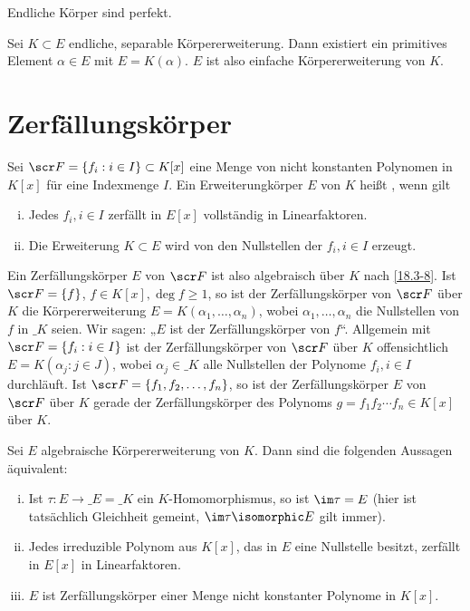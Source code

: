 \begin{kor} \label{19.2-5}
	Endliche Körper sind perfekt.
\end{kor}

\begin{st}
	Sei $K \subset E$ endliche, separable Körpererweiterung.
	Dann existiert ein primitives Element $\alpha \in E$ mit $E = K(\alpha)$.
	$E$ ist also einfache Körpererweiterung von $K$.
\end{st}


\section{Zerfällungskörper}


\begin{df} \label{19.3-1}
	Sei $\scr F = \{ f_i : i \in I \} \subset K[x]$ eine Menge von nicht konstanten Polynomen in $K[x]$ für eine Indexmenge $I$.
	Ein Erweiterungkörper $E$ von $K$ heißt , wenn gilt
	\begin{enumerate}[i)]
		\item
			Jedes $f_i, i \in I$ zerfällt in $E[x]$ vollständig in Linearfaktoren.
		\item
			Die Erweiterung $K \subset E$ wird von den Nullstellen der $f_i, i \in I$ erzeugt.
	\end{enumerate}
\end{df}

Ein Zerfällungskörper $E$ von $\scr F$ ist also algebraisch über $K$ nach \ref{18.3-8}.
Ist $\scr F = \{f\}$, $f \in K[x], \deg f \ge 1$, so ist der Zerfällungskörper von $\scr F$ über $K$ die Körpererweiterung $E = K(\alpha_1, \dotsc, \alpha_n)$, wobei $\alpha_1, \dotsc, \alpha_n$ die Nullstellen von $f$ in $\_K$ seien.
Wir sagen: „$E$ ist der Zerfällungskörper von $f$“.
Allgemein mit $\scr F = \{ f_i : i \in I\}$ ist der Zerfällungskörper von $\scr F$ über $K$ offensichtlich $E = K(\alpha_j : j \in J)$, wobei $\alpha_j \in \_K$ alle Nullstellen der Polynome $f_i, i \in I$ durchläuft.
Ist $\scr F = \{ f_1, f_2, \dotsc, f_n \}$, so ist der Zerfällungskörper $E$ von $\scr F$ über $K$ gerade der Zerfällungskörper des Polynoms $g = f_1 f_2 \dotsb f_n \in K[x]$ über $K$.

\begin{st} \label{19.3-2}
	Sei $E$ algebraische Körpererweiterung von $K$.
	Dann sind die folgenden Aussagen äquivalent:
	\begin{enumerate}[i)]
		\item
			Ist $\tau: E \to \_E = \_K$ ein $K$-Homomorphismus, so ist $\im \tau = E$ (hier ist tatsächlich Gleichheit gemeint, $\im \tau \isomorphic E$ gilt immer).
		\item
			Jedes irreduzible Polynom aus $K[x]$, das in $E$ eine Nullstelle besitzt, zerfällt in $E[x]$ in Linearfaktoren.
		\item
			$E$ ist Zerfällungskörper einer Menge nicht konstanter Polynome in $K[x]$.
	\end{enumerate}
\end{st}

